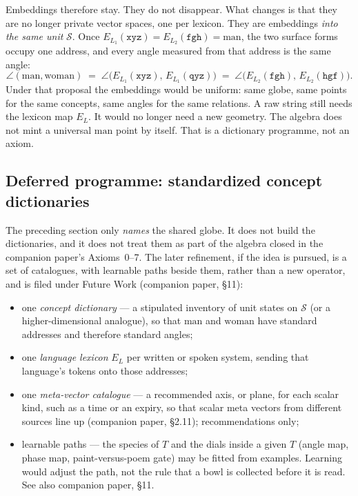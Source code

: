 \documentclass[12pt, a4paper]{article}
\begin{document}
Embeddings therefore stay. They do not disappear.
What changes is that they are no longer private vector spaces, one
per lexicon. They are embeddings \emph{into the same unit}
$\mathcal{S}$. Once $E_{L_1}(\texttt{xyz})=E_{L_2}(\texttt{fgh})=\mathrm{man}$,
the two surface forms occupy one address, and every angle measured
from that address is the same angle:
\begin{equation}
    \angle(\mathrm{man},\mathrm{woman})
    \;=\;
    \angle\bigl(E_{L_1}(\texttt{xyz}),\,E_{L_1}(\texttt{qyz})\bigr)
    \;=\;
    \angle\bigl(E_{L_2}(\texttt{fgh}),\,E_{L_2}(\texttt{hgf})\bigr).
    \label{eq:uniform_angles}
\end{equation}
Under that proposal the embeddings would be uniform: same globe, same points for the same
concepts, same angles for the same relations. A raw string still
needs the lexicon map $E_L$. It would no longer need a new geometry.
The algebra does not mint a universal $\mathrm{man}$ point by itself. That is a dictionary programme, not an axiom.


\subsection{Deferred programme: standardized concept dictionaries}
\label{subsec:standard_dictionaries}
The preceding section only \emph{names} the shared globe. It does not
build the dictionaries, and it does not treat them as part of the
algebra closed in the companion paper's Axioms~0--7. The later refinement, if the idea is
pursued, is a set of catalogues, with learnable paths beside them, rather than a new operator, and is
filed under Future Work (companion paper, \S11):
\begin{itemize}
    \item one \emph{concept dictionary} --- a stipulated inventory of
          unit states on $\mathcal{S}$ (or a higher-dimensional
          analogue), so that $\mathrm{man}$ and $\mathrm{woman}$ have
          standard addresses and therefore standard angles;
    \item one \emph{language lexicon} $E_L$ per written or spoken
          system, sending that language's tokens onto those addresses;
    \item one \emph{meta-vector catalogue} --- a recommended axis, or plane,
          for each scalar kind, such as a time or an expiry, so that
          scalar meta vectors from different sources line up
          (companion paper, \S2.11); recommendations only;
    \item learnable paths --- the species of $T$ and the dials inside
          a given $T$ (angle map, phase map, paint-versus-poem gate)
          may be fitted from examples. Learning would adjust the path,
          not the rule that a bowl is collected before it is read.
                    See also companion paper, \S11.
\end{itemize}
\end{document}
